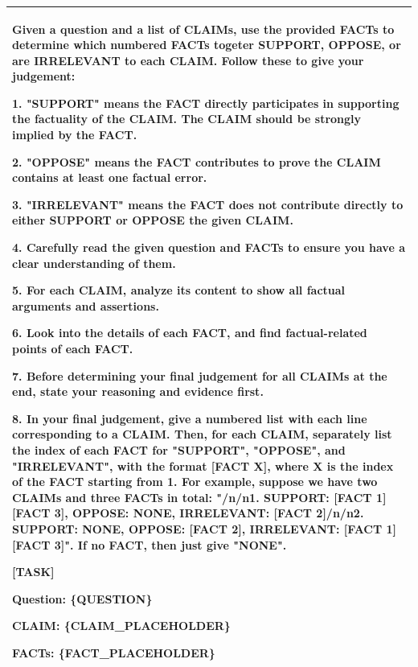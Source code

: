 \documentclass{article} %
\begin{document}
\begin{table}[htbp]
{\begin{tabular}{p{22cm}}
Given a question and a list of CLAIMs, use the provided FACTs to determine which numbered FACTs togeter SUPPORT, OPPOSE, or are IRRELEVANT to each CLAIM. Follow these to give your judgement:

1. "SUPPORT" means the FACT directly participates in supporting the factuality of the CLAIM. The CLAIM should be strongly implied by the FACT.

2. "OPPOSE" means the FACT contributes to prove the CLAIM contains at least one factual error.

3. "IRRELEVANT" means the FACT does not contribute directly to either SUPPORT or OPPOSE the given CLAIM.

4. Carefully read the given question and FACTs to ensure you have a clear understanding of them. 

5. For each CLAIM, analyze its content to show all factual arguments and assertions.

6. Look into the details of each FACT, and find factual-related points of each FACT.

7. Before determining your final judgement for all CLAIMs at the end, state your reasoning and evidence first.

8. In your final judgement, give a numbered list with each line corresponding to a CLAIM. Then, for each CLAIM, separately list the index of each FACT for "SUPPORT", "OPPOSE", and "IRRELEVANT", with the format [FACT X], where X is the index of the FACT starting from 1. For example, suppose we have two CLAIMs and three FACTs in total: "/n/n1. SUPPORT: [FACT 1][FACT 3], OPPOSE: NONE, IRRELEVANT: [FACT 2]/n/n2. SUPPORT: NONE, OPPOSE: [FACT 2], IRRELEVANT: [FACT 1][FACT 3]". If no FACT, then just give "NONE".

\vspace{4mm} 

[TASK]

Question:
\{QUESTION\}

CLAIM:
\{CLAIM\_PLACEHOLDER\}

FACTs:
\{FACT\_PLACEHOLDER\} \\
\bottomrule
\end{tabular}
}

\end{table}
\end{document}
